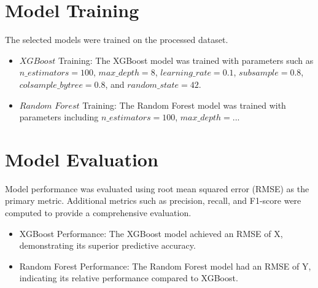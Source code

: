 \documentclass{article}
\begin{document}
\section{Model Training}
The selected models were trained on the processed dataset.

\begin{itemize}
    \item $XGBoost$ Training: The XGBoost model was trained with parameters such as $n\_estimators=100$, $max\_depth=8$, $learning\_rate=0.1$, $subsample=0.8$, $colsample\_bytree=0.8$, and $random\_state=42$.
    \item $Random$ $Forest$ Training: The Random Forest model was trained with parameters including $n\_estimators=100$, $max\_depth=...$
\end{itemize}

\section{Model Evaluation}
Model performance was evaluated using root mean squared error (RMSE) as the primary metric. Additional metrics such as precision, recall, and F1-score were computed to provide a comprehensive evaluation.
\begin{itemize}
    \item XGBoost Performance: The XGBoost model achieved an RMSE of X, demonstrating its superior predictive accuracy.
    \item Random Forest Performance: The Random Forest model had an RMSE of Y, indicating its relative performance compared to XGBoost.
\end{itemize}
\end{document}

